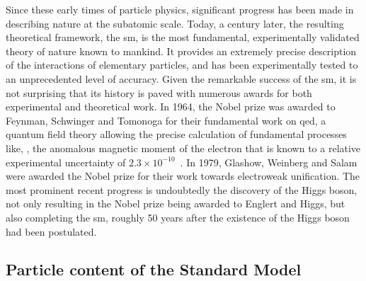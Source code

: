 Since these early times of particle physics, significant progress has been made in describing nature at the subatomic scale.
Today, a century later, the resulting theoretical framework, the \gls{sm}, is the most fundamental, experimentally validated theory of nature known to mankind.
It provides an extremely precise description of the interactions of elementary particles, and has been experimentally tested to an unprecedented level of accuracy. Given the remarkable success of the \gls{sm}, it is not surprising that its history is paved with numerous awards for both experimental and theoretical work.
In 1964, the Nobel prize was awarded to Feynman, Schwinger and Tomonoga for their fundamental work on \gls{qed}, a quantum field theory allowing the precise calculation of fundamental processes like, \eg, the anomalous magnetic moment of the electron that is known to a relative experimental uncertainty of $2.3 \times 10^{-10}$~\cite{Mohr:2015ccw}.
In 1979, Glashow, Weinberg and Salam were awarded the Nobel prize for their work towards electroweak unification.
The most prominent recent progress is undoubtedly the discovery of the Higgs boson, not only resulting in the Nobel prize being awarded to Englert and Higgs, but also completing the \gls{sm}, roughly 50 years after the existence of the Higgs boson had been postulated. 

		
\subsection{Particle content of the Standard Model}

